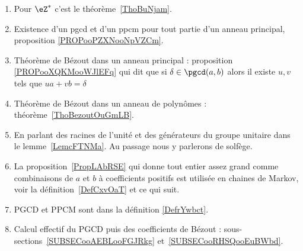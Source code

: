  \label{THEMEooNRZHooYuuHyt}
\begin{enumerate}
	\item
	      Pour \( \eZ^*\) c'est le théorème~\ref{ThoBuNjam}.
	\item
	      Existence d'un pgcd et d'un ppcm pour tout partie d'un anneau principal, proposition \ref{PROPooPZXNooNpVZCm}.
	\item
	      Théorème de Bézout dans un anneau principal : proposition \ref{PROPooXQKMooWJlEFq} qui dit que si \( \delta\in \pgcd(a,b) \) alors il existe \( u,v\) tels que \( ua+vb=\delta\)
	\item
	      Théorème de Bézout dans un anneau de polynômes : théorème~\ref{ThoBezoutOuGmLB}.
	\item
	      En parlant des racines de l'unité et des générateurs du groupe unitaire dans le lemme~\ref{LemcFTNMa}. Au passage nous y parlerons de solfège.
	\item
	      La proposition~\ref{PropLAbRSE} qui donne tout entier assez grand comme combinaisons de \( a \) et \( b\) à coefficients positifs est utilisée en chaines de Markov, voir la définition~\ref{DefCxvOaT} et ce qui suit.
	\item
	      PGCD et PPCM sont dans la définition \ref{DefrYwbct}.
	\item
	      Calcul effectif du PGCD puis des coefficients de Bézout : sous-sections~\ref{SUBSECooAEBLooFGJRkg} et~\ref{SUBSECooRHSQooEuBWbd}.
\end{enumerate}
